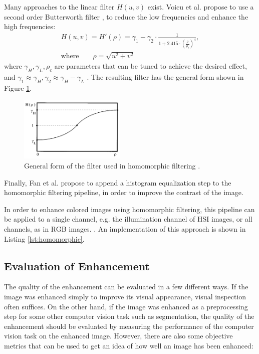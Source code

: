 \documentclass[sigconf]{acmart}
\begin{document}
Many approaches to the linear filter $H(u,v)$ exist. Voicu et al. propose to use a second order Butterworth filter \cite{voicu1997practical}, to reduce the low frequencies and enhance the high frequencies:
\begin{align}
	H(u, v) = H'(\rho) = \gamma_1  - \gamma_2 \cdot \frac{1}{1 + 2.415 \cdot \left(\frac{\rho}{\rho_c}\right)^{4}},\\
	\text{where} \qquad \rho = \sqrt{u^2 + v^2}
\end{align}
where $\gamma_H, \gamma_L, \rho_c$ are parameters that can be tuned to achieve the desired effect, and $\gamma_1 \approx \gamma_H, \gamma_2 \approx \gamma_H - \gamma_L$ \cite{voicu1997practical}. The resulting filter has the general form shown in Figure \ref{fig:homomorphic-filter}.

\begin{figure}
	\centering
	\includegraphics[width=0.45\textwidth]{images/filter.png}
	\caption{General form of the filter used in homomorphic filtering \cite{voicu1997practical}.}
	\label{fig:homomorphic-filter}
\end{figure}

Finally, Fan et al. \cite{fan2011homomorphic} propose  to append a histogram equalization step to the homomorphic filtering pipeline, in order to improve the contrast of the image.

In order to enhance colored images using homomorphic filtering, this pipeline can be applied to a single channel, e.g. the illumination channel of HSI images, or all channels, as in RGB images. \cite{voicu1997practical,fan2011homomorphic}. An implementation of this approach is shown in Listing \ref{lst:homomorphic}.

\subsection{Evaluation of Enhancement}\label{sec:evaluation}
The quality of the enhancement can be evaluated in a few different ways. If the image was enhanced simply to improve its visual appearance, visual inspection often suffices. On the other hand, if the image was enhanced as a preprocessing step for some other computer vision task such as segmentation, the quality of the enhancement should be evaluated by measuring the performance of the computer vision task on the enhanced image. However, there are also some objective metrics that can be used to get an idea of how well an image has been enhanced:
\end{document}
